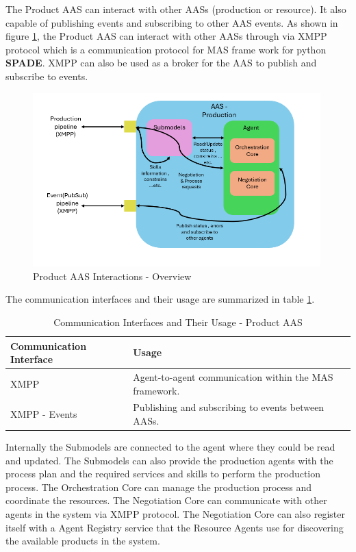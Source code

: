 \newpage
The Product AAS can interact with other AASs (production or resource).
It also capable of publishing events and subscribing to other AAS events.
As shown in figure \ref{fig:product_aas_interactions}, the Product AAS can interact with other AASs through
via XMPP protocol which is a communication protocol for MAS frame work for python \textbf{SPADE}.
XMPP can also be used as a broker for the AAS to publish and subscribe to events.
\begin{figure}[h]
    \centering
    \includegraphics[width=0.99\textwidth]{Images/Production_Agent_Interaction_Overview.png}
    \caption{Product AAS Interactions - Overview}
    \label{fig:product_aas_interactions}
\end{figure}
The communication interfaces and their usage are summarized in table \ref{table:communication_interfaces_product}.
\begin{table}[h]
\centering
\begin{tabularx}{\textwidth}{>{\raggedright\arraybackslash}X>{\raggedright\arraybackslash}X}
\toprule
\rowcolor[HTML]{38FFF8}
\textbf{Communication Interface} & \textbf{Usage} \\ \midrule
XMPP & Agent-to-agent communication within the MAS framework. \\
XMPP - Events & Publishing and subscribing to events between AASs. \\
\bottomrule
\end{tabularx}
\caption{Communication Interfaces and Their Usage - Product AAS}
\label{table:communication_interfaces_product}
\end{table}
\newpage
Internally the Submodels are connected to the agent where they could be read and updated.
The Submodels can also provide the production agents with the process plan and the required services and skills
to perform the production process.
The Orchestration Core can manage the production process and coordinate the resources.
The Negotiation Core can communicate with other agents in the system via XMPP protocol.
The Negotiation Core can also register itself with a Agent Registry service that the Resource Agents
use for discovering the available products in the system.

